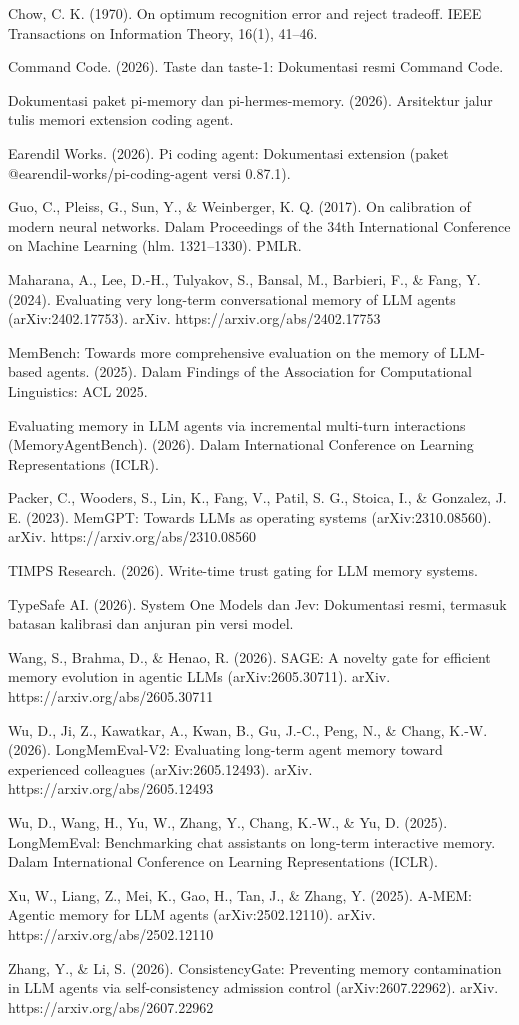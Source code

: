 \documentclass[
]{article}
\begin{document}
Chow, C. K. (1970). On optimum recognition error and reject tradeoff.
IEEE Transactions on Information Theory, 16(1), 41--46.

Command Code. (2026). Taste dan taste-1: Dokumentasi resmi Command Code.

Dokumentasi paket pi-memory dan pi-hermes-memory. (2026). Arsitektur
jalur tulis memori extension coding agent.

Earendil Works. (2026). Pi coding agent: Dokumentasi extension (paket
@earendil-works/pi-coding-agent versi 0.87.1).

Guo, C., Pleiss, G., Sun, Y., \& Weinberger, K. Q. (2017). On
calibration of modern neural networks. Dalam Proceedings of the 34th
International Conference on Machine Learning (hlm. 1321--1330). PMLR.

Maharana, A., Lee, D.-H., Tulyakov, S., Bansal, M., Barbieri, F., \&
Fang, Y. (2024). Evaluating very long-term conversational memory of LLM
agents (arXiv:2402.17753). arXiv. https://arxiv.org/abs/2402.17753

MemBench: Towards more comprehensive evaluation on the memory of
LLM-based agents. (2025). Dalam Findings of the Association for
Computational Linguistics: ACL 2025.

Evaluating memory in LLM agents via incremental multi-turn interactions
(MemoryAgentBench). (2026). Dalam International Conference on Learning
Representations (ICLR).

Packer, C., Wooders, S., Lin, K., Fang, V., Patil, S. G., Stoica, I., \&
Gonzalez, J. E. (2023). MemGPT: Towards LLMs as operating systems
(arXiv:2310.08560). arXiv. https://arxiv.org/abs/2310.08560

TIMPS Research. (2026). Write-time trust gating for LLM memory systems.

TypeSafe AI. (2026). System One Models dan Jev: Dokumentasi resmi,
termasuk batasan kalibrasi dan anjuran pin versi model.

Wang, S., Brahma, D., \& Henao, R. (2026). SAGE: A novelty gate for
efficient memory evolution in agentic LLMs (arXiv:2605.30711). arXiv.
https://arxiv.org/abs/2605.30711

Wu, D., Ji, Z., Kawatkar, A., Kwan, B., Gu, J.-C., Peng, N., \& Chang,
K.-W. (2026). LongMemEval-V2: Evaluating long-term agent memory toward
experienced colleagues (arXiv:2605.12493). arXiv.
https://arxiv.org/abs/2605.12493

Wu, D., Wang, H., Yu, W., Zhang, Y., Chang, K.-W., \& Yu, D. (2025).
LongMemEval: Benchmarking chat assistants on long-term interactive
memory. Dalam International Conference on Learning Representations
(ICLR).

Xu, W., Liang, Z., Mei, K., Gao, H., Tan, J., \& Zhang, Y. (2025).
A-MEM: Agentic memory for LLM agents (arXiv:2502.12110). arXiv.
https://arxiv.org/abs/2502.12110

Zhang, Y., \& Li, S. (2026). ConsistencyGate: Preventing memory
contamination in LLM agents via self-consistency admission control
(arXiv:2607.22962). arXiv. https://arxiv.org/abs/2607.22962
\end{document}
